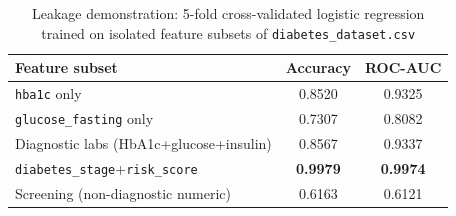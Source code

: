 \begin{table}[!t]
\renewcommand{\arraystretch}{1.2}
\caption{Leakage demonstration: 5-fold cross-validated logistic regression
trained on isolated feature subsets of \texttt{diabetes\_dataset.csv}}
\label{tab:leakage}
\centering
\begin{tabular}{l c c}
\toprule
\textbf{Feature subset} & \textbf{Accuracy} & \textbf{ROC-AUC} \\
\midrule
\texttt{hba1c} only & 0.8520 & 0.9325 \\
\texttt{glucose\_fasting} only & 0.7307 & 0.8082 \\
Diagnostic labs (HbA1c+glucose+insulin) & 0.8567 & 0.9337 \\
\texttt{diabetes\_stage}+\texttt{risk\_score} & \textbf{0.9979} & \textbf{0.9974} \\
\midrule
Screening (non-diagnostic numeric) & 0.6163 & 0.6121 \\
\bottomrule
\end{tabular}
\end{table}
